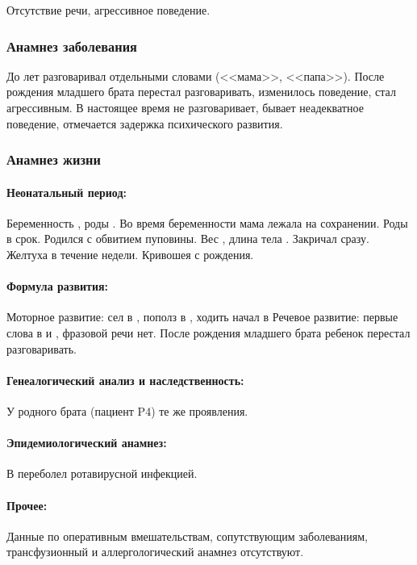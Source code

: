 \documentclass[a4paper,14pt]{extarticle}
\newcommand{\gramm}{г}
\newcommand{\cm}{см}
\newcommand{\months}{мес.}
\begin{document}
Отсутствие речи, агрессивное поведение.

\subsubsection*{Анамнез заболевания}

До  лет разговаривал отдельными словами (<<мама>>, <<папа>>).
После рождения младшего брата перестал разговаривать, изменилось поведение, стал агрессивным. 
В настоящее время не разговаривает, бывает неадекватное поведение, отмечается задержка психического развития.

\subsubsection*{Анамнез жизни}

\paragraph{Неонатальный период:} Беременность , роды .
Во время беременности мама лежала на сохранении. Роды в срок. Родился с обвитием пуповины.
Вес \numprint[\gramm]{3710}, длина тела \numprint[\cm]{54}. Закричал сразу. Желтуха в течение недели. Кривошея с рождения.

\paragraph{Формула развития:} Моторное развитие: сел в \numprint[\months]{9}, пополз в \numprint[\months]{8}, ходить начал в \numprint[\months]{10}
Речевое развитие: первые слова в  и \numprint[\months]{3}, фразовой речи нет. После рождения младшего брата ребенок перестал разговаривать. 

\paragraph{Генеалогический анализ и наследственность:} У родного брата (пациент P4) те же проявления.

\paragraph{Эпидемиологический анамнез:} В \numprint[\months]{5} переболел ротавирусной инфекцией.

\paragraph{Прочее:} Данные по оперативным вмешательствам, сопутствующим заболеваниям, трансфузионный и аллергологический анамнез отсутствуют.
\end{document}
